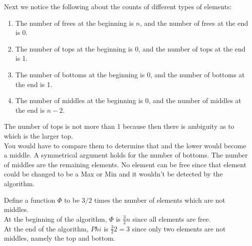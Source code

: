 \documentclass[11pt]{article}
\begin{document}
Next we notice the following about the counts of different types of elements:

\begin{enumerate}
\item The number of frees at the beginning is $n$, and the number of frees at the end is 0.
\item The number of tops at the beginning is $0$, and the number of tops at the end is 1.
\item The number of bottoms at the beginning is $0$, and the number of bottoms at the end is 1.
\item The number of middles at the beginning is $0$, and the number of middles at the end is $n-2$.
\end{enumerate}

The number of tops is not more than 1 because then there is ambiguity as to which is the larger top.\\
You would have to compare them to determine that and the lower would become a middle. A symmetrical argument
holds for the number of bottoms. The number of middles are the remaining elements. No element can be free
since that element could be changed to be a Max or Min and it wouldn't be detected by the algorithm.

Define a function $\Phi$ to be $3/2$ times the number of elements which are not middles.\\
At the beginning of the algorithm, $\Phi$ is $\frac{3}{2} n$ since all elements are free.\\
At the end of the algorithm, $Phi$ is $\frac{3}{2} 2 = 3$ since only two elements are not middles, namely the top and bottom.
\end{document}
